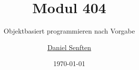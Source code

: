 \documentclass{manual}
\title{Modul 404}
\subtitle{Objektbasiert programmieren nach Vorgabe}
\date{\today}
\author{\href{mailto:daniel.senften@talent-factory.ch}{Daniel Senften}}
\begin{document}


\newpage\appendix
\listofexercises

\renewcommand{\listoflistingscaption}{Programmbeispiele}
\newpage\listoflistings
\end{document}
